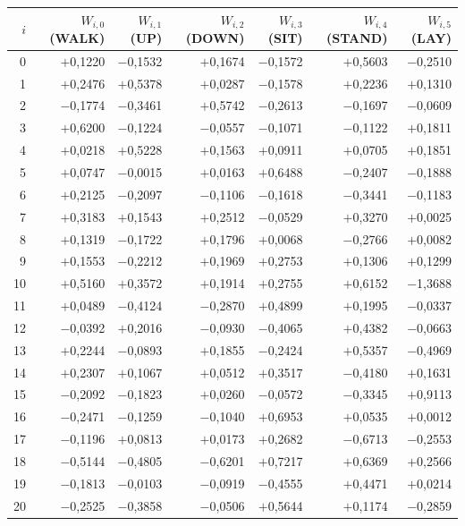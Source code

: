 \begin{tabular}{rrrrrrr}
\toprule
$i$ & $W_{i,0}$ (WALK) & $W_{i,1}$ (UP) & $W_{i,2}$ (DOWN) & $W_{i,3}$ (SIT) & $W_{i,4}$ (STAND) & $W_{i,5}$ (LAY) \\
\midrule
0 & $+$0,1220 & $-$0,1532 & $+$0,1674 & $-$0,1572 & $+$0,5603 & $-$0,2510 \\
1 & $+$0,2476 & $+$0,5378 & $+$0,0287 & $-$0,1578 & $+$0,2236 & $+$0,1310 \\
2 & $-$0,1774 & $-$0,3461 & $+$0,5742 & $-$0,2613 & $-$0,1697 & $-$0,0609 \\
3 & $+$0,6200 & $-$0,1224 & $-$0,0557 & $-$0,1071 & $-$0,1122 & $+$0,1811 \\
4 & $+$0,0218 & $+$0,5228 & $+$0,1563 & $+$0,0911 & $+$0,0705 & $+$0,1851 \\
5 & $+$0,0747 & $-$0,0015 & $+$0,0163 & $+$0,6488 & $-$0,2407 & $-$0,1888 \\
6 & $+$0,2125 & $-$0,2097 & $-$0,1106 & $-$0,1618 & $-$0,3441 & $-$0,1183 \\
7 & $+$0,3183 & $+$0,1543 & $+$0,2512 & $-$0,0529 & $+$0,3270 & $+$0,0025 \\
8 & $+$0,1319 & $-$0,1722 & $+$0,1796 & $+$0,0068 & $-$0,2766 & $+$0,0082 \\
9 & $+$0,1553 & $-$0,2212 & $+$0,1969 & $+$0,2753 & $+$0,1306 & $+$0,1299 \\
10 & $+$0,5160 & $+$0,3572 & $+$0,1914 & $+$0,2755 & $+$0,6152 & $-$1,3688 \\
11 & $+$0,0489 & $-$0,4124 & $-$0,2870 & $+$0,4899 & $+$0,1995 & $-$0,0337 \\
12 & $-$0,0392 & $+$0,2016 & $-$0,0930 & $-$0,4065 & $+$0,4382 & $-$0,0663 \\
13 & $+$0,2244 & $-$0,0893 & $+$0,1855 & $-$0,2424 & $+$0,5357 & $-$0,4969 \\
14 & $+$0,2307 & $+$0,1067 & $+$0,0512 & $+$0,3517 & $-$0,4180 & $+$0,1631 \\
15 & $-$0,2092 & $-$0,1823 & $+$0,0260 & $-$0,0572 & $-$0,3345 & $+$0,9113 \\
16 & $-$0,2471 & $-$0,1259 & $-$0,1040 & $+$0,6953 & $+$0,0535 & $+$0,0012 \\
17 & $-$0,1196 & $+$0,0813 & $+$0,0173 & $+$0,2682 & $-$0,6713 & $-$0,2553 \\
18 & $-$0,5144 & $-$0,4805 & $-$0,6201 & $+$0,7217 & $+$0,6369 & $+$0,2566 \\
19 & $-$0,1813 & $-$0,0103 & $-$0,0919 & $-$0,4555 & $+$0,4471 & $+$0,0214 \\
20 & $-$0,2525 & $-$0,3858 & $-$0,0506 & $+$0,5644 & $+$0,1174 & $-$0,2859 \\

\end{tabular}
